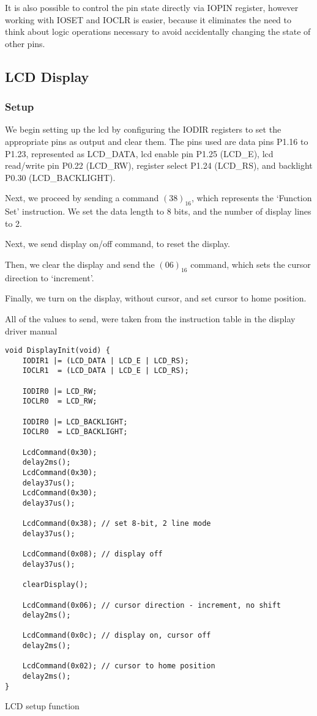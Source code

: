 \documentclass[10pt]{article}
\begin{document}
It is also possible to control the pin state directly via IOPIN register, however working with IOSET and IOCLR is easier, because it eliminates the need to think about logic operations necessary to avoid accidentally changing the state of other pins.

\subsection{LCD Display}
\subsubsection{Setup}
We begin setting up the lcd by configuring the IODIR registers to set the appropriate pins as output and clear them.
The pins used are data pins P1.16 to P1.23, represented as {LCD\_DATA}, lcd enable pin P1.25 (LCD\_E), lcd \mbox{read/write} pin P0.22 (LCD\_RW), register select P1.24 (LCD\_RS), and backlight P0.30 (LCD\_BACKLIGHT).

Next, we proceed by sending a command $(38)_{16}$, which represents the `Function Set' instruction.
We set the data length to 8 bits, and the number of display lines to 2.

Next, we send display on/off command, to reset the display.

Then, we clear the display and send the $(06)_{16}$ command, which sets the cursor direction to `increment'.

Finally, we turn on the display, without cursor, and set cursor to home position.

All of the values to send, were taken from the instruction table in the display driver manual \cite[p.24]{display-man}

\begin{program}[H]
	\begin{lstlisting}
void DisplayInit(void) {
	IODIR1 |= (LCD_DATA | LCD_E | LCD_RS);
	IOCLR1  = (LCD_DATA | LCD_E | LCD_RS);

	IODIR0 |= LCD_RW;
	IOCLR0  = LCD_RW;
	
    IODIR0 |= LCD_BACKLIGHT;
    IOCLR0  = LCD_BACKLIGHT;

    LcdCommand(0x30);
    delay2ms();
    LcdCommand(0x30);
    delay37us();
    LcdCommand(0x30);
    delay37us();

    LcdCommand(0x38); // set 8-bit, 2 line mode
    delay37us();

    LcdCommand(0x08); // display off
    delay37us();

    clearDisplay();

    LcdCommand(0x06); // cursor direction - increment, no shift
    delay2ms();

    LcdCommand(0x0c); // display on, cursor off
    delay2ms();

    LcdCommand(0x02); // cursor to home position
    delay2ms();
}
	\end{lstlisting}
	\caption{LCD setup function}
\end{program}
\end{document}
